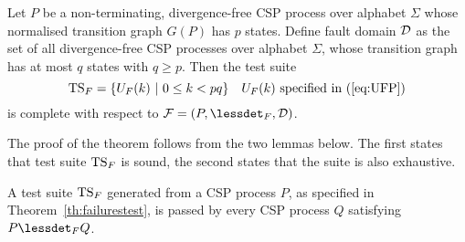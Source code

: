 \begin{theorem}\label{th:failurestest}
Let $P$ be a non-terminating, divergence-free CSP process over alphabet $\Sigma$ whose
normalised transition graph $G(P)$ has $p$ states. Define fault domain ${\cal
D}$ as the set of all divergence-free CSP processes over alphabet $\Sigma$,
whose transition graph has at most $q$ states with $q \ge p$. Then the test
suite
\[
{\text{TS}}_F = \{ U_F(k)~|~0 \le k < pq  \}\quad\text{$U_F(k)$ specified in (\ref{eq:UFP})}
\]
is complete with respect to ${\cal F} = (P,\lessdet_F,{\cal D})$.
\end{theorem}
%
The proof of the theorem follows from the two lemmas below. The first states
that test suite ${\text{TS}}_F$ is sound, the second states that the suite is also
exhaustive.
%
\begin{lemma}\label{lemma:mainfsound}
A test suite ${\text{TS}}_F$ generated from a CSP process $P$, as specified in
Theorem~\ref{th:failurestest}, is passed by every CSP process $Q$ satisfying
$P\lessdet_F Q$.
\end{lemma}
